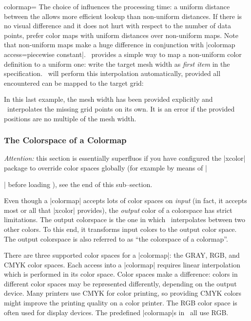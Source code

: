 \begin{pgfplotskey}{colormap=}
The choice of  influences the processing time: a uniform distance between the  allows more efficient lookup than non-uniform distances. If there is no visual difference and it does not hurt with respect to the number of data points, prefer color maps with uniform distances over non-uniform maps. Note that non-uniform maps make a huge difference in conjunction with |colormap access=piecewise constant|. \PGFPlots\ provides a simple way to map a non-uniform color definition to a uniform one: write the target mesh width as \emph{first item} in the specification. \PGFPlots\ will perform this interpolation automatically, provided all encountered  can be mapped to the target grid:

\begin{codeexample}[code only]
\end{codeexample}

\noindent In this last example, the mesh width has been provided explicitly and \PGFPlots\ interpolates the missing grid points on its own. It is an error if the provided positions are no multiple of the mesh width. 


\subsubsection{The Colorspace of a Colormap}

\emph{Attention:} this section is essentially superfluos if you have configured the |xcolor| package to override color spaces globally (for example by means of |\usepackage[cmyk]{xcolor}| before loading \PGFPlots), see the end of this sub--section.

Even though a |colormap| accepts lots of color spaces on \emph{input} (in fact, it accepts most or all that |xcolor| provides), the \emph{output} color of a colorspace has strict limitations. The output colorspace is the one in which \PGFPlots\ interpolates between two other colors. To this end, it transforms input colors to the output color space. The output colorspace is also referred to as ``the colorspace of a colormap''.

There are three supported color spaces for a |colormap|: the GRAY, RGB, and CMYK color spaces. Each access into a |colormap| requires linear interpolation which is performed in its color space. Color spaces make a difference: colors in different color spaces may be represented differently, depending on the output device. Many printers use CMYK for color printing, so providing CMYK colors might improve the printing quality on a color printer. The RGB color space is often used for display devices. The predefined |colormap|s in \PGFPlots\ all use RGB.


\end{pgfplotskey}
